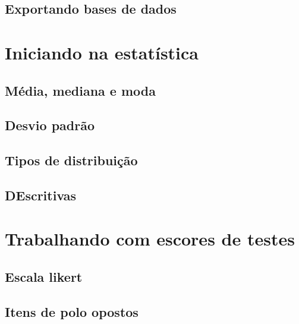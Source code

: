 \documentclass[
]{book}
\begin{document}
\hypertarget{exportando-bases-de-dados}{%
\section{Exportando bases de dados}\label{exportando-bases-de-dados}}

\hypertarget{estatistica}{%
\chapter{Iniciando na estatística}\label{estatistica}}

\hypertarget{muxe9dia-mediana-e-moda}{%
\section{Média, mediana e moda}\label{muxe9dia-mediana-e-moda}}

\hypertarget{desvio-padruxe3o}{%
\section{Desvio padrão}\label{desvio-padruxe3o}}

\hypertarget{tipos-de-distribuiuxe7uxe3o}{%
\section{Tipos de distribuição}\label{tipos-de-distribuiuxe7uxe3o}}

\hypertarget{descritivas}{%
\section{DEscritivas}\label{descritivas}}

\hypertarget{primeirasAnalises}{%
\chapter{Trabalhando com escores de testes}\label{primeirasAnalises}}

\hypertarget{escala-likert}{%
\section{Escala likert}\label{escala-likert}}

\hypertarget{itens-de-polo-opostos}{%
\section{Itens de polo opostos}\label{itens-de-polo-opostos}}
\end{document}
